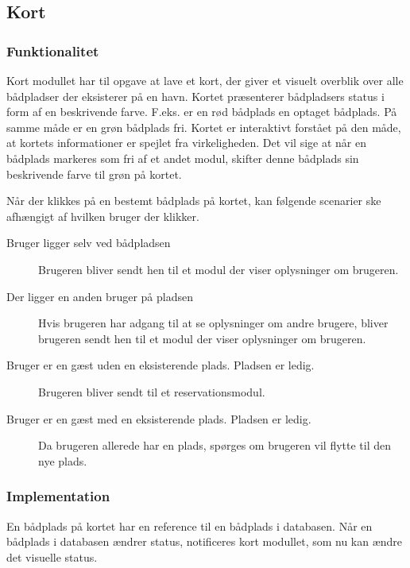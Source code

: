 \subsection{Kort}
\label{sub:kort}

\subsubsection{Funktionalitet}
\label{ssub:Funktionalitet}

Kort modullet har til opgave at lave et kort, der giver et visuelt overblik over alle bådpladser der eksisterer på en havn. Kortet præsenterer bådpladsers status i form af en beskrivende farve. F.eks. er en rød bådplads en optaget bådplads. På samme måde er en grøn bådplads fri. Kortet er interaktivt forstået på den måde, at kortets informationer er spejlet fra virkeligheden. Det vil sige at når en bådplads markeres som fri af et andet modul, skifter denne bådplads sin beskrivende farve til grøn på kortet.

Når der klikkes på en bestemt bådplads på kortet, kan følgende scenarier ske afhængigt af hvilken bruger der klikker.

\begin{description}
  \item[Bruger ligger selv ved bådpladsen] Brugeren bliver sendt hen til et modul der viser oplysninger om brugeren.
  \item[Der ligger en anden bruger på pladsen] Hvis brugeren har adgang til at se oplysninger om andre brugere, bliver brugeren sendt hen til et modul der viser oplysninger om brugeren.
  \item[Bruger er en gæst uden en eksisterende plads. Pladsen er ledig.] Brugeren bliver sendt til et reservationsmodul.
  \item[Bruger er en gæst med en eksisterende plads. Pladsen er ledig.] Da brugeren allerede har en plads, spørges om brugeren vil flytte til den nye plads.
\end{description}

\subsubsection{Implementation}
\label{ssub:Implementation}

En bådplads på kortet har en reference til en bådplads i databasen. Når en bådplads i databasen ændrer status, notificeres kort modullet, som nu kan ændre det visuelle status.


